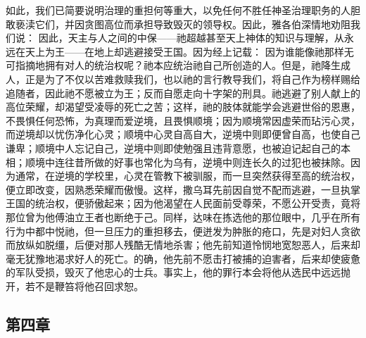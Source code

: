 如此，我们已简要说明治理的重担何等重大，以免任何不胜任神圣治理职务的人胆敢亵渎它们，并因贪图高位而承担导致毁灭的领导权。因此，雅各伯深情地劝阻我们说： 因此，天主与人之间的中保——祂超越甚至天上神体的知识与理解，从永远在天上为王——在地上却逃避接受王国。因为经上记载： 因为谁能像祂那样无可指摘地拥有对人的统治权呢？祂本应统治祂自己所创造的人。但是，祂降生成人，正是为了不仅以苦难救赎我们，也以祂的言行教导我们，将自己作为榜样赐给追随者，因此祂不愿被立为王；反而自愿走向十字架的刑具。祂逃避了别人献上的高位荣耀，却渴望受凌辱的死亡之苦；这样，祂的肢体就能学会逃避世俗的恩惠，不畏惧任何恐怖，为真理而爱逆境，且畏惧顺境；因为顺境常因虚荣而玷污心灵，而逆境却以忧伤净化心灵；顺境中心灵自高自大，逆境中则即便曾自高，也使自己谦卑；顺境中人忘记自己，逆境中则即使勉强且违背意愿，也被迫记起自己的本相；顺境中连往昔所做的好事也常化为乌有，逆境中则连长久的过犯也被抹除。因为通常，在逆境的学校里，心灵在管教下被驯服，而一旦突然获得至高的统治权，便立即改变，因熟悉荣耀而傲慢。这样，撒乌耳先前因自觉不配而逃避，一旦执掌王国的统治权，便骄傲起来；因为他渴望在人民面前受尊荣，不愿公开受责，竟将那位曾为他傅油立王者也断绝于己。同样，达味在拣选他的那位眼中，几乎在所有行为中都中悦祂，但一旦压力的重担移去，便迸发为肿胀的疮口，先是对妇人贪欲而放纵如脱缰，后便对那人残酷无情地杀害；他先前知道怜悯地宽恕恶人，后来却毫无犹豫地渴求好人的死亡。的确，他先前不愿击打被捕的迫害者，后来却使疲惫的军队受损，毁灭了他忠心的士兵。事实上，他的罪行本会将他从选民中远远抛开，若不是鞭笞将他召回求恕。\par


\subsection{第四章}

\par

